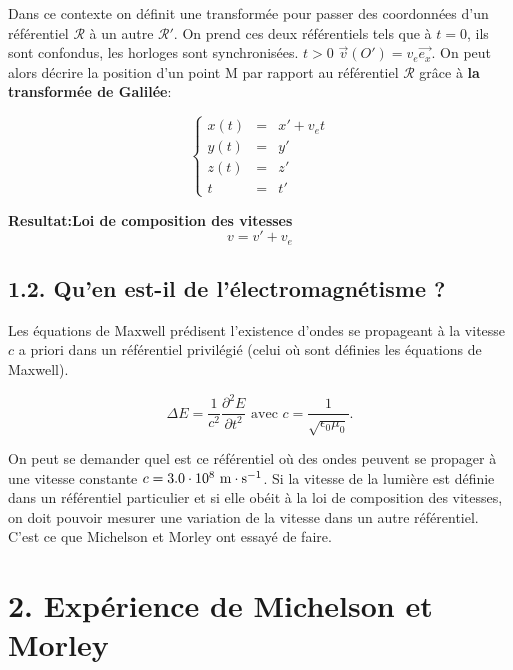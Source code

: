 \documentclass[french, a4paper, 10pt, twocolumn, landscape]{article}
\begin{document}

Dans ce contexte on définit une transformée pour passer des coordonnées d'un référentiel $\mathcal{R}$ à un autre $\mathcal{R}'$. On prend ces deux référentiels tels que à $t=0$, ils sont confondus, les horloges sont synchronisées. $t>0$ $\vec{v}(O') = v_e\vec{e_x}$. On peut alors décrire la position d'un point M par rapport au référentiel $\mathcal{R}$ grâce à \textbf{la transformée de Galilée}:


\begin{equation}
	\left\{\begin{array}{rcl}
		x(t) &=& x'+v_e t\\
		y(t) &=& y'\\
		z(t) &=& z'\\
		t &=& t'
	\end{array}\right.
\end{equation}

\textbf{Resultat:Loi de composition des vitesses}
	\begin{equation}
		v = v'+v_e
	\end{equation}


\subsection*{1.2. Qu'en est-il de l'électromagnétisme ?}
Les équations de Maxwell prédisent l'existence d'ondes se propageant à la vitesse $c$ a priori dans un référentiel privilégié (celui où sont définies les équations de Maxwell).

\begin{equation}
	\Delta E = \dfrac{1}{c^2}\dfrac{\partial^2 E}{\partial t^2} \text{ avec } c=\dfrac{1}{\sqrt{\epsilon_0\mu_0}}.
\end{equation}

On peut se demander quel est ce référentiel où des ondes peuvent se propager à une vitesse constante $c=3.0\cdot10^8~\rm m\cdot s^{-1}$. Si la vitesse de la lumière est définie dans un référentiel particulier et si elle obéit à la loi de composition des vitesses, on doit pouvoir mesurer une variation de la vitesse dans un autre référentiel. C'est ce que Michelson et Morley ont essayé de faire. 

\section*{2. Expérience de Michelson et Morley}
\end{document}

